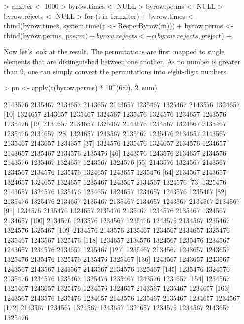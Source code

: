 \documentclass{scrartcl}
\begin{document}
\begin{Schunk}
\begin{Sinput}
> anziter <- 1000
> byrow.times <- NULL
> byrow.perms <- NULL
> byrow.rejects <- NULL
> for (i in 1:anziter) {
+     byrow.times <- rbind(byrow.times, system.time(p <- ResperByrow(m)))
+     byrow.perms <- rbind(byrow.perms, p$perm)
+     byrow.rejects <- c(byrow.rejects, p$reject)
+ }
\end{Sinput}
\end{Schunk}

Now let's look at the result. The permutations are first mapped to single elements that are distinguished between one another. As no number is greater than 9, one can simply convert the permutations into eight-digit numbers.

\begin{Schunk}
\begin{Sinput}
> pn <- apply(t(byrow.perms) * 10^(6:0), 2, sum)
\end{Sinput}
\begin{Soutput}
   [1] 2143576 2135467 2134657 2143657 2143657 1235467 1325467 2143576 1324657
  [10] 1324657 2143657 1235467 1324567 1235476 1324576 1234657 1243576 1235476
  [19] 2134657 2134657 1325467 2143576 1234567 1324567 2135467 1235476 2134657
  [28] 1324657 1243567 2135467 1235476 2134657 2143567 2135467 2143657 1234657
  [37] 1324576 1235476 1324657 2134576 1234657 2143657 2135467 2134576 2135476
  [46] 1243576 1243576 2134657 2134576 2143576 1235467 1324657 1243567 1324576
  [55] 2143576 1324567 2143567 1234567 2134576 1235476 1324657 1243657 1235476
  [64] 2134567 2143657 1324657 1324657 1324657 1235467 1243567 2134567 1324576
  [73] 1325476 2143657 1324576 1235476 1234657 1324657 1234657 1243576 1235467
  [82] 2135476 1325476 2134657 2135467 2135467 2134657 1243567 2134567 2134567
  [91] 1234576 2135476 1324657 2135476 2135467 1234576 2135467 1324567 2134657
 [100] 2134576 1243576 1234567 1235476 1243576 2134567 1235467 1324576 1325467
 [109] 2134576 2143576 2135467 1234567 2134657 1325476 1235467 1243567 1325476
 [118] 1234657 2134576 1324567 1235476 1234567 1243657 1234576 2134657 1235467
 [127] 1235467 2134567 1243657 1243657 1325476 2135476 1325476 2135476 1325467
 [136] 1243567 1243657 1243567 1243567 2143567 1243567 2143567 2134576 1325467
 [145] 1235476 1324576 2135476 1234576 1235467 1325476 1235467 1243576 1234657
 [154] 1234567 1325467 1243657 1325476 1234576 1324657 2143567 1235467 1234657
 [163] 1243567 2143576 1235476 1234657 2143576 1235467 2135467 1234657 1234567
 [172] 2143567 1234567 1324567 1243657 1324657 1234576 1234567 2143657 1325476

\end{Soutput}
\end{Schunk}
\end{document}
